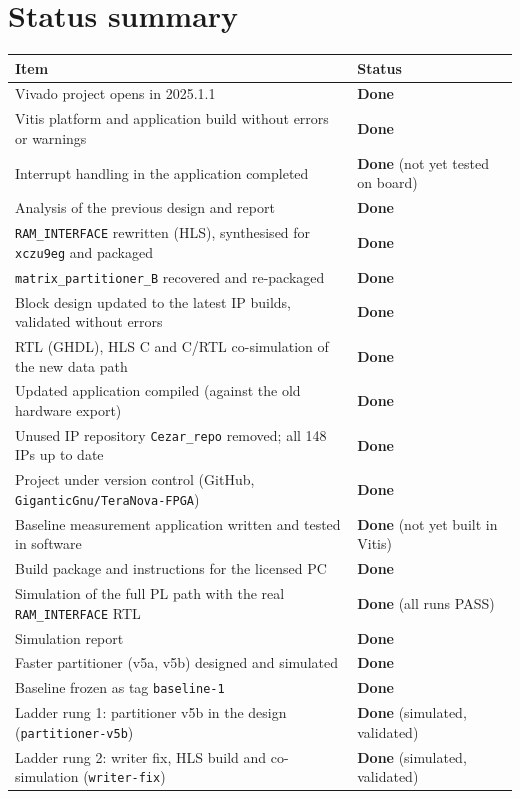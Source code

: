 \documentclass[11pt,a4paper]{article}
\newcommand{\code}[1]{\texttt{#1}}
\newcommand{\ok}{\textcolor{okgreen}{\textbf{Done}}}
\begin{document}
\section{Status summary}
\begin{table}[H]
\centering
\begin{tabularx}{\textwidth}{@{}Yl@{}}
\toprule
\textbf{Item} & \textbf{Status} \\
\midrule
Vivado project opens in 2025.1.1 & \ok \\
Vitis platform and application build without errors or warnings & \ok \\
Interrupt handling in the application completed & \ok{} (not yet tested on board) \\
Analysis of the previous design and report & \ok \\
\code{RAM\_INTERFACE} rewritten (HLS), synthesised for \code{xczu9eg} and packaged & \ok \\
\code{matrix\_partitioner\_B} recovered and re-packaged & \ok \\
Block design updated to the latest IP builds, validated without errors & \ok \\
RTL (GHDL), HLS C and C/RTL co-simulation of the new data path & \ok \\
Updated application compiled (against the old hardware export) & \ok \\
Unused IP repository \code{Cezar\_repo} removed; all 148 IPs up to date & \ok \\
Project under version control (GitHub, \code{GiganticGnu/TeraNova-FPGA}) & \ok \\
Baseline measurement application written and tested in software & \ok{} (not yet built in Vitis) \\
Build package and instructions for the licensed PC & \ok \\
Simulation of the full PL path with the real \code{RAM\_INTERFACE} RTL & \ok{} (all runs PASS) \\
Simulation report & \ok \\
Faster partitioner (v5a, v5b) designed and simulated & \ok \\
Baseline frozen as tag \code{baseline-1} & \ok \\
Ladder rung 1: partitioner v5b in the design (\code{partitioner-v5b}) & \ok{} (simulated, validated) \\
Ladder rung 2: writer fix, HLS build and co-simulation (\code{writer-fix}) & \ok{} (simulated, validated) \\

\end{tabularx}
\end{table}
\end{document}
